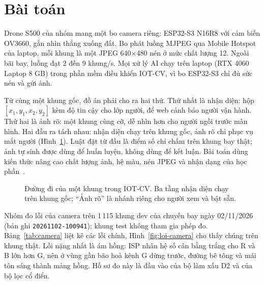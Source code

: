 \section{Bài toán}\label{sec:bai-toan}

Drone S500 của nhóm mang một bo camera riêng: ESP32-S3 N16R8 với cảm biến OV3660, gắn nhìn thẳng xuống đất. Bo phát luồng MJPEG qua Mobile Hotspot của laptop, mỗi khung là một JPEG 640$\times$480 nén ở mức chất lượng 12. Ngoài bãi bay, luồng đạt 2 đến 9 khung/s. Mọi xử lý AI chạy trên laptop (RTX 4060 Laptop 8 GB) trong phần mềm điều khiển IOT-CV, vì bo ESP32-S3 chỉ đủ sức nén và gửi ảnh.

Từ cùng một khung gốc, đồ án phải cho ra hai thứ. Thứ nhất là nhận diện: hộp $[x_1,y_1,x_2,y_2]$ kèm độ tin cậy cho lớp người, để web cảnh báo người vận hành. Thứ hai là ảnh rõ: một khung cùng cỡ, dễ nhìn hơn cho người ngồi trước màn hình. Hai đầu ra tách nhau: nhận diện chạy trên khung gốc, ảnh rõ chỉ phục vụ mắt người (Hình~\ref{fig:pipeline}). Luật đặt từ đầu là điểm số chỉ chấm trên khung bay thật; ảnh tự sinh được dùng để huấn luyện, không dùng để kết luận. Bài toán dùng kiến thức nâng cao chất lượng ảnh, hệ màu, nén JPEG và nhận dạng của học phần~\cite{baigiang,gonzalez}.

\begin{figure}[!htbp]
\centering
\resizebox{\textwidth}{!}{}
\caption[Đường đi của một khung trong IOT-CV]{Đường đi của một khung trong IOT-CV. Ba tầng nhận diện chạy trên khung gốc; ``Ảnh rõ'' là nhánh riêng cho người xem và bật sẵn.}
\label{fig:pipeline}
\end{figure}

Nhóm đo lỗi của camera trên 1\,115 khung dev của chuyến bay ngày 02/11/2026 (bản ghi \texttt{20261102-100941}); khung test không tham gia phép đo. Bảng~\ref{tab:camera} liệt kê các lỗi chính, Hình~\ref{fig:loi-camera} cho thấy chúng trên khung thật. Lỗi nặng nhất là ám hồng: ISP nhân hệ số cân bằng trắng cho R và B lớn hơn G, nên ở vùng gần bão hoà kênh G dừng trước, đường bê tông và mái tôn sáng thành mảng hồng. Hồ sơ đo này là đầu vào của bộ làm xấu D2 và của bộ lọc cổ điển.

